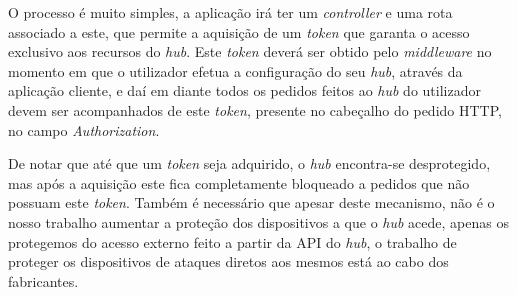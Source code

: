 O processo é muito simples, a aplicação irá ter um \textit{controller} e uma rota associado a este, que permite a aquisição de um \textit{token} que garanta o acesso exclusivo aos recursos do \textit{hub}. Este \textit{token} deverá ser obtido pelo \textit{middleware} no momento em que o utilizador efetua a configuração do seu \textit{hub}, através da aplicação cliente, e daí em diante todos os pedidos feitos ao \textit{hub} do utilizador devem ser acompanhados de este \textit{token}, presente no cabeçalho do pedido HTTP, no campo \textit{Authorization}. 

De notar que até que um \textit{token} seja adquirido, o \textit{hub} encontra-se desprotegido, mas após a aquisição este fica completamente bloqueado a pedidos que não possuam este \textit{token}. Também é necessário que apesar deste mecanismo, não é o nosso trabalho aumentar a proteção dos dispositivos a que o \textit{hub} acede, apenas os protegemos do acesso externo feito a partir da API do \textit{hub}, o trabalho de proteger os dispositivos de ataques diretos aos mesmos está ao cabo dos fabricantes.